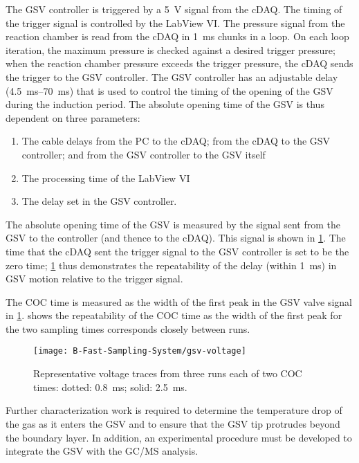 \documentclass[../main.tex]{subfiles}
\begin{document}
The GSV controller is triggered by a \SI{5}{\volt} signal from the cDAQ.
The timing of the trigger signal is controlled by the LabView VI. The pressure
signal from the reaction chamber is read from the cDAQ in \SI{1}{\milli\second}
chunks in a loop. On each loop iteration, the maximum pressure is checked
against a desired trigger pressure; when the reaction chamber pressure exceeds
the trigger pressure, the cDAQ sends the trigger to the GSV controller. The
GSV controller has an adjustable delay (\SIrange{4.5}{70}{\milli\second}) that
is used to control the timing of the opening of the GSV during the induction period.
The absolute opening time of the GSV is thus dependent on three parameters:
\begin{enumerate}
\item The cable delays from the PC to the cDAQ; from the cDAQ to the GSV
      controller; and from the GSV controller to the GSV itself
\item The processing time of the LabView VI
\item The delay set in the GSV controller.
\end{enumerate}

The absolute opening time of the GSV is measured by
the signal sent from the GSV to the controller (and thence to the cDAQ).
This signal is shown in \cref{fig:gsv-voltage}. The time that
the cDAQ sent the trigger signal to the GSV controller is set to be the
zero time; \cref{fig:gsv-voltage} thus demonstrates the
repeatability of the delay (within \SI{1}{\milli\second}) in 
GSV motion relative to the trigger signal.

The COC time is measured as the width of the first peak in the
GSV valve signal in \cref{fig:gsv-voltage}.  
shows the repeatability of the COC time as the width of the first 
peak for the two sampling times corresponds closely between runs.

\begin{figure}
\texttt{[image: B-Fast-Sampling-System/gsv-voltage]}
\caption{Representative voltage traces from three runs each of two
COC times: dotted: \SI{0.8}{\milli\second}; solid: \SI{2.5}{\milli\second}.}
\label{fig:gsv-voltage}
\end{figure}

Further characterization work is required to determine the temperature
drop of the gas as it enters the GSV and to ensure that the GSV tip
protrudes beyond the boundary layer. In addition, an experimental
procedure must be developed to integrate the GSV with the GC/MS analysis.
\end{document}
